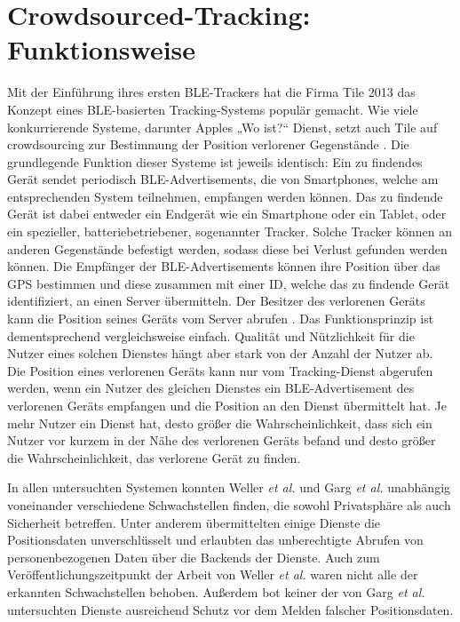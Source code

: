 \section{Crowdsourced-Tracking: Funktionsweise}
\label{sec:Funktionsweise}

Mit der Einführung ihres ersten \ac{BLE}-Trackers hat die Firma Tile 2013 das Konzept eines \ac{BLE}-basierten Tracking-Systems populär gemacht.
Wie viele konkurrierende Systeme, darunter Apples „Wo ist?“ Dienst, setzt auch Tile auf crowdsourcing zur Bestimmung der Position verlorener Gegenstände \cite{Weller_BLE_Finders}.
Die grundlegende Funktion dieser Systeme ist jeweils identisch: Ein zu findendes Gerät sendet periodisch \ac{BLE}-Advertisements, die von Smartphones, welche am entsprechenden System teilnehmen, empfangen werden können.
Das zu findende Gerät ist dabei entweder ein Endgerät wie ein Smartphone oder ein Tablet, oder ein spezieller, batteriebetriebener, sogenannter Tracker.
Solche Tracker können an anderen Gegenstände befestigt werden, sodass diese bei Verlust gefunden werden können.
Die Empfänger der \ac{BLE}-Advertisements können ihre Position über das \ac{GPS} bestimmen und diese zusammen mit einer ID, welche das zu findende Gerät identifiziert, an einen Server übermitteln.
Der Besitzer des verlorenen Geräts kann die Position seines Geräts vom Server abrufen \cite{Garg_Secure_Tracker}.
Das Funktionsprinzip ist dementsprechend vergleichsweise einfach.
Qualität und Nützlichkeit für die Nutzer eines solchen Dienstes hängt aber stark von der Anzahl der Nutzer ab.
Die Position eines verlorenen Geräts kann nur vom Tracking-Dienst abgerufen werden, wenn ein Nutzer des gleichen Dienstes ein \ac{BLE}-Advertisement des verlorenen Geräts empfangen und die Position an den Dienst übermittelt hat.
Je mehr Nutzer ein Dienst hat, desto größer die Wahrscheinlichkeit, dass sich ein Nutzer vor kurzem in der Nähe des verlorenen Geräts befand und desto größer die Wahrscheinlichkeit, das verlorene Gerät zu finden.


In allen untersuchten Systemen konnten Weller \textit{et al.} \cite{Weller_BLE_Finders} und Garg \textit{et al.} \cite{Garg_Secure_Tracker} unabhängig voneinander verschiedene Schwachstellen finden, die sowohl Privatsphäre als auch Sicherheit betreffen.
Unter anderem übermittelten einige Dienste die Positionsdaten unverschlüsselt und erlaubten das unberechtigte Abrufen von personenbezogenen Daten über die Backends der Dienste.
Auch zum Veröffentlichungszeitpunkt der Arbeit von Weller \textit{et al.} \cite{Weller_BLE_Finders} waren nicht alle der erkannten Schwachstellen behoben.
Außerdem bot keiner der von Garg \textit{et al.} \cite{Garg_Secure_Tracker} untersuchten Dienste ausreichend Schutz vor dem Melden falscher Positionsdaten.


